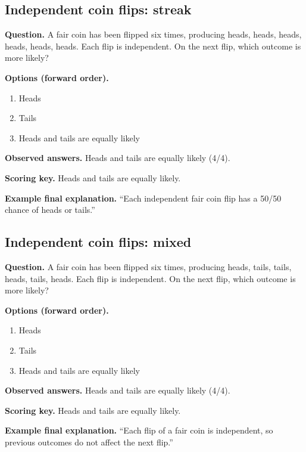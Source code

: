 \noindent\begin{minipage}{\linewidth}
\subsection{Independent coin flips: streak}
\noindent\textbf{Question.} A fair coin has been flipped six times, producing heads, heads, heads, heads, heads, heads. Each flip is independent. On the next flip, which outcome is more likely?\par
\noindent\textbf{Options (forward order).}\par
\begin{enumerate}[nosep,leftmargin=*]
\item Heads
\item Tails
\item Heads and tails are equally likely
\end{enumerate}
\noindent\textbf{Observed answers.} Heads and tails are equally likely (4/4).\par
\noindent\textbf{Scoring key.} Heads and tails are equally likely.\par
\noindent\textbf{Example final explanation.} ``Each independent fair coin flip has a 50/50 chance of heads or tails.''\par
\end{minipage}\par\medskip

\noindent\begin{minipage}{\linewidth}
\subsection{Independent coin flips: mixed}
\noindent\textbf{Question.} A fair coin has been flipped six times, producing heads, tails, tails, heads, tails, heads. Each flip is independent. On the next flip, which outcome is more likely?\par
\noindent\textbf{Options (forward order).}\par
\begin{enumerate}[nosep,leftmargin=*]
\item Heads
\item Tails
\item Heads and tails are equally likely
\end{enumerate}
\noindent\textbf{Observed answers.} Heads and tails are equally likely (4/4).\par
\noindent\textbf{Scoring key.} Heads and tails are equally likely.\par
\noindent\textbf{Example final explanation.} ``Each flip of a fair coin is independent, so previous outcomes do not affect the next flip.''\par
\end{minipage}\par\medskip

